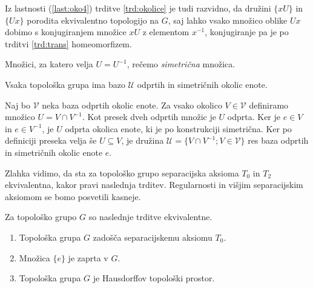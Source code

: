 \documentclass[mat1]{fmfdelo}
\newcommand{\Ucurl}{\mathcal{U}}
\begin{document}
\begin{dokaz}
Iz lastnosti (\ref{last:oko4}) trditve \ref{trd:okolice} je tudi razvidno, da družini $\lbrace xU \rbrace$ in $\lbrace Ux \rbrace$ porodita ekvivalentno topologijo na $G$, saj lahko vsako množico oblike $Ux$ dobimo s konjugiranjem množice $xU$ z elementom $x^{-1}$, konjugiranje pa je po trditvi \ref{trd:trans} homeomorfizem.
\end{dokaz}

\begin{definicija}\label{def:sim}
Množici, za katero velja $U = U^{-1}$, rečemo \emph{simetrična} množica.
\end{definicija}

\begin{trditev}\label{trd:sim}
Vsaka topološka grupa ima bazo $\Ucurl$ odprtih in simetričnih okolic enote.
\end{trditev}

\begin{dokaz}
Naj bo $\mathcal{V}$ neka baza odprtih okolic enote. Za vsako okolico $V \in \mathcal{V}$ definiramo množico $U = V \cap V^{-1}$. Kot presek dveh odprtih množic je $U$ odprta. Ker je $e \in V$ in $e \in V^{-1}$, je $U$ odprta okolica enote, ki je po konstrukciji simetrična. Ker po definiciji preseka velja še $U \subseteq V$, je družina $\Ucurl = \lbrace V \cap V^{-1}; V \in \mathcal{V} \rbrace$ res baza odprtih in simetričnih okolic enote $e$.
\end{dokaz}

Zlahka vidimo, da sta za topološko grupo separacijska aksioma $T_0$ in $T_2$ ekvivalentna, kakor pravi naslednja trditev. Regularnosti in višjim separacijskim aksiomom se bomo posvetili kasneje.
\begin{trditev}\label{trd:t0haus}
Za topološko grupo $G$ so naslednje trditve ekvivalentne.
\begin{enumerate}
	\item Topološka grupa $G$ zadošča separacijskemu aksiomu $T_0$.\label{podtrd:h1}
	\item Množica $\lbrace e \rbrace$ je zaprta v $G$.\label{podtrd:h2}
	\item Topološka grupa $G$ je Hausdorffov topološki prostor.\label{podtrd:h3}
\end{enumerate}
\end{trditev}
\end{document}
